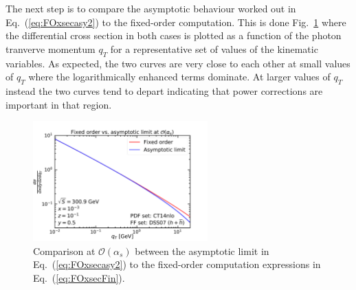 \documentclass[10pt,a4paper]{article}
\begin{document}
The next step is to compare the asymptotic behaviour worked out in
Eq.~(\ref{eq:FOxsecasy2}) to the fixed-order computation. This is done
Fig.~\ref{fig:FOvsAsy} where the differential cross section in both
cases is plotted as a function of the photon tranverve momentum $q_T$
for a representative set of values of the kinematic variables. As
expected, the two curves are very close to each other at small values
of $q_T$ where the logarithmically enhanced terms dominate. At larger
values of $q_T$ instead the two curves tend to depart indicating that
power corrections are important in that region.
\begin{figure}[t]
  \begin{centering}
    \includegraphics[width=0.6\textwidth]{plots/FOvsAsy}
    \caption{Comparison at $\mathcal{O}(\alpha_s)$ between the
      asymptotic limit in Eq.~(\ref{eq:FOxsecasy2}) to the fixed-order
      computation expressions in
      Eq.~(\ref{eq:FOxsecFin}).\label{fig:FOvsAsy}}
  \end{centering}
\end{figure}
\end{document}
